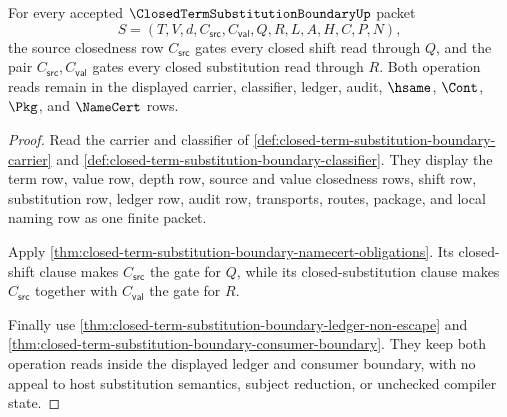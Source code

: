 \begin{theorem}
\label{thm:closed-term-substitution-boundary-root-closedness-gate}
For every accepted $\ClosedTermSubstitutionBoundaryUp$ packet
$$
S=(T,V,d,C_{\mathsf{src}},C_{\mathsf{val}},Q,R,L,A,H,C,P,N),
$$
the source closedness row $C_{\mathsf{src}}$ gates every closed shift read through $Q$, and the pair $C_{\mathsf{src}},C_{\mathsf{val}}$ gates every closed substitution read through $R$. Both operation reads remain in the displayed carrier, classifier, ledger, audit, $\hsame$, $\Cont$, $\Pkg$, and $\NameCert$ rows.
\end{theorem}
\begin{proof}
Read the carrier and classifier of \autoref{def:closed-term-substitution-boundary-carrier} and \autoref{def:closed-term-substitution-boundary-classifier}. They display the term row, value row, depth row, source and value closedness rows, shift row, substitution row, ledger row, audit row, transports, routes, package, and local naming row as one finite packet.

Apply \autoref{thm:closed-term-substitution-boundary-namecert-obligations}. Its closed-shift clause makes $C_{\mathsf{src}}$ the gate for $Q$, while its closed-substitution clause makes $C_{\mathsf{src}}$ together with $C_{\mathsf{val}}$ the gate for $R$.

Finally use \autoref{thm:closed-term-substitution-boundary-ledger-non-escape} and \autoref{thm:closed-term-substitution-boundary-consumer-boundary}. They keep both operation reads inside the displayed ledger and consumer boundary, with no appeal to host substitution semantics, subject reduction, or unchecked compiler state.
\end{proof}

